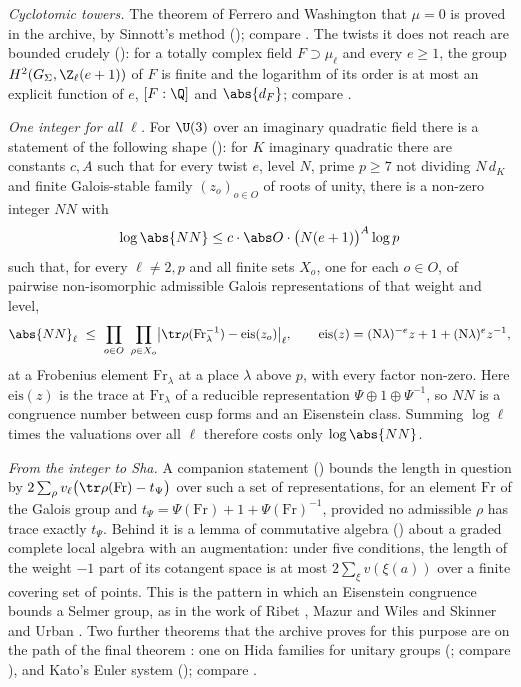 \emph{Cyclotomic towers.} The theorem of Ferrero and Washington
\cite{ferrerowashington1979} that $\mu=0$ is proved in the archive, by Sinnott's method
\cite{sinnott1984} \lvS{} (); compare \cite{iwasawa1973}. The twists it does not
reach are bounded crudely \lvS{} (): for a totally complex field
$F\supset\mu_\ell$ and every $e\ge1$, the group $H^2(G_\Sigma,\Z_\ell(e+1))$ of $F$ is finite and the
logarithm of its order is at most an explicit function of $e$, $[F:\Q]$ and $\abs{d_F}$;
compare \cite{soule1979,borel1974}.

\emph{One integer for all $\ell$.} For $\U(3)$ over an imaginary quadratic field there is a
statement of the following shape \lvS{}
(): for $K$ imaginary quadratic there are constants $c,A$ such
that for every twist $e$, level $N$, prime $p\ge7$ not dividing $N\,d_K$ and finite
Galois-stable family $(z_o)_{o\in O}$ of roots of unity, there is a non-zero integer $NN$ with
\[
\log\abs{NN}\le c\cdot\abs O\cdot\bigl(N(e+1)\bigr)^A\log p
\]
such that, for every $\ell\ne2,p$ and all finite sets $X_o$, one for each $o\in O$, of
pairwise non-isomorphic admissible Galois representations of that weight and level,
\[
\abs{NN}_\ell\ \le\ \prod_{o\in O}\ \prod_{\rho\in X_o}\bigl|\tr\rho(\mathrm{Fr}_\lambda^{-1})-\mathrm{eis}(z_o)\bigr|_\ell,
\qquad \mathrm{eis}(z)=(\mathrm N\lambda)^{-e}z+1+(\mathrm N\lambda)^{e}z^{-1},
\]
at a Frobenius element $\mathrm{Fr}_\lambda$ at a place $\lambda$ above $p$, with every factor non-zero. Here $\mathrm{eis}(z)$
is the trace at $\mathrm{Fr}_\lambda$ of a reducible representation $\Psi\oplus1\oplus\Psi^{-1}$, so $NN$ is
a congruence number between cusp forms and an Eisenstein class. Summing $\log\ell$ times the
valuations over all $\ell$ therefore costs only $\log\abs{NN}$.

\emph{From the integer to Sha.} A companion statement \lvS{} () bounds the
length in question by $2\sum_{\rho}v_\ell\bigl(\tr\rho(\mathrm{Fr})-t_\Psi\bigr)$ over such a set of
representations, for an element $\mathrm{Fr}$ of the Galois group and
$t_\Psi=\Psi(\mathrm{Fr})+1+\Psi(\mathrm{Fr})^{-1}$, provided no admissible $\rho$ has
trace exactly $t_\Psi$. Behind it is a lemma of commutative algebra \lvS{} () about a
graded complete local algebra with an augmentation: under five conditions, the length of the
weight $-1$ part of its cotangent space is at most $2\sum_\xi v(\xi(a))$ over a finite covering
set of points. This is the pattern in which an Eisenstein congruence bounds a Selmer group, as
in the work of Ribet \cite{ribet1976}, Mazur and Wiles \cite{mazurwiles1984} and Skinner and
Urban \cite{skinnerurban2014}. Two further theorems that the archive proves for this purpose
are on the path of the final theorem \lvS: one on Hida families for unitary groups
(; compare \cite{hida1986}), and Kato's Euler system
\cite{kato2004} (); compare \cite{blochkato1990}.

